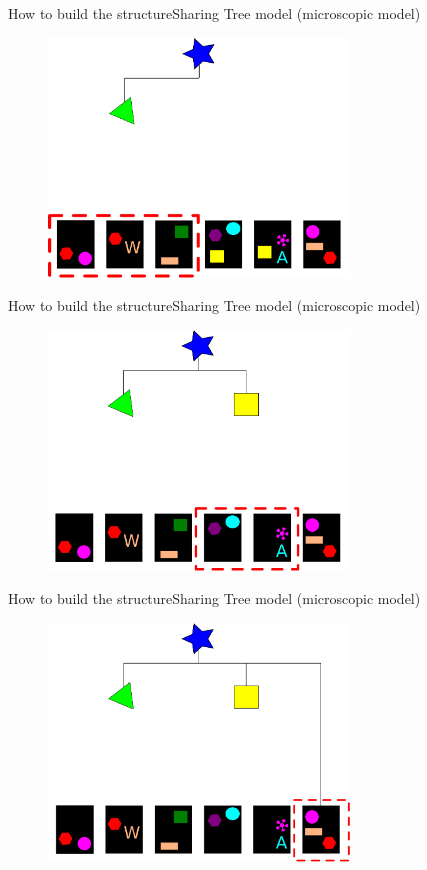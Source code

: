 \documentclass[11pt,svgnames]{beamer}
\begin{document}
\begin{frame}[noframenumbering]{How to build the structure}{Sharing Tree model (microscopic model)}
\begin{figure}[p]%
\center
\includegraphics[width=8cm,draft=false]{immagini/aa4.pdf}
\end{figure}
\end{frame}
\begin{frame}[noframenumbering]{How to build the structure}{Sharing Tree model (microscopic model)}
\begin{figure}[p]%
\center
\includegraphics[width=8cm,draft=false]{immagini/aa5.pdf}
\end{figure}
\end{frame}
\begin{frame}[noframenumbering]{How to build the structure}{Sharing Tree model (microscopic model)}
\begin{figure}[p]%
\center
\includegraphics[width=8cm,draft=false]{immagini/aa6.pdf}
\end{figure}
\end{frame}
\end{document}

